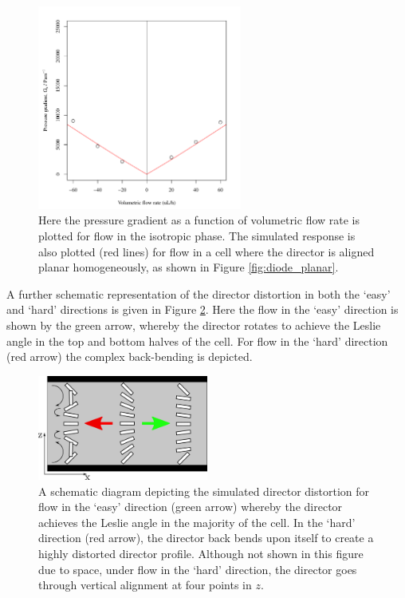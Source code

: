 \begin{figure}
\begin{center}
\includegraphics[width=0.6\textwidth]{Figures/Diode/simulation_new_iso}
\end{center}
\caption[Comparison of experimental data and simulation for flow in the isotropic phase]{\label{fig:simulation_iso}Here the pressure gradient as a function of volumetric flow rate is plotted for flow in the isotropic phase. The simulated response is also plotted (red lines) for  flow in a cell where the director is aligned planar homogeneously, as shown in Figure \ref{fig:diode_planar}.}
\end{figure}

A further schematic representation of the director distortion in both the `easy' and `hard' directions is given in Figure \ref{fig:easy_hard}. Here the flow in the `easy' direction is shown by the green arrow, whereby the director rotates to achieve the Leslie angle in the top and bottom halves of the cell. For flow in the `hard' direction (red arrow) the complex back-bending is depicted.

\begin{figure}
\begin{center}
\includegraphics[width=0.5\textwidth]{Figures/Diode/easy_hard}
\end{center}
\caption[Schematic diagram of the simulated director profiles for flow in the `easy' and `hard' directions]{\label{fig:easy_hard}A schematic diagram depicting the simulated director distortion for flow in the `easy' direction (green arrow) whereby the director achieves the Leslie angle in the majority of the cell. In the `hard' direction (red arrow), the director back bends upon itself to create a highly distorted director profile. Although not shown in this figure due to space, under flow in the `hard' direction, the director goes through vertical alignment at four points in $z$.}
\end{figure}


